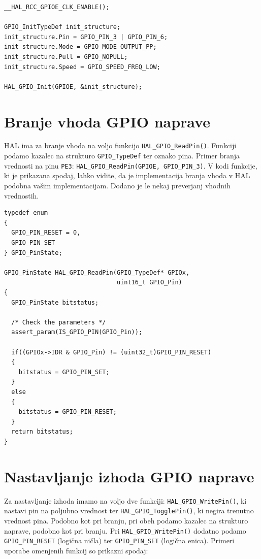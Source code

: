 \documentclass[12pt,letterpaper]{article}
\begin{document}
\begin{center}
\begin{lstlisting}[style=CStyle]
__HAL_RCC_GPIOE_CLK_ENABLE();

GPIO_InitTypeDef init_structure;
init_structure.Pin = GPIO_PIN_3 | GPIO_PIN_6;
init_structure.Mode = GPIO_MODE_OUTPUT_PP;
init_structure.Pull = GPIO_NOPULL;
init_structure.Speed = GPIO_SPEED_FREQ_LOW;

HAL_GPIO_Init(GPIOE, &init_structure);
\end{lstlisting}
\end{center}


\section*{Branje vhoda GPIO naprave}

HAL ima za branje vhoda na voljo funkcijo \texttt{HAL\_GPIO\_ReadPin()}. Funkciji podamo kazalec na strukturo \texttt{GPIO\_TypeDef} ter oznako pina. Primer branja vrednosti na pinu \texttt{PE3}: \texttt{HAL\_GPIO\_ReadPin(GPIOE, GPIO\_PIN\_3)}. V kodi funkcije, ki je prikazana spodaj, lahko vidite, da je implementacija branja vhoda v HAL podobna vašim implementacijam. Dodano je le nekaj preverjanj vhodnih vrednostih.

\begin{center}
\begin{lstlisting}[style=CStyle]
typedef enum
{
  GPIO_PIN_RESET = 0,
  GPIO_PIN_SET
} GPIO_PinState;

GPIO_PinState HAL_GPIO_ReadPin(GPIO_TypeDef* GPIOx,
                               uint16_t GPIO_Pin)
{
  GPIO_PinState bitstatus;

  /* Check the parameters */
  assert_param(IS_GPIO_PIN(GPIO_Pin));

  if((GPIOx->IDR & GPIO_Pin) != (uint32_t)GPIO_PIN_RESET)
  {
    bitstatus = GPIO_PIN_SET;
  }
  else
  {
    bitstatus = GPIO_PIN_RESET;
  }
  return bitstatus;
}
\end{lstlisting}
\end{center}


\section*{Nastavljanje izhoda GPIO naprave}

Za nastavljanje izhoda imamo na voljo dve funkciji: \texttt{HAL\_GPIO\_WritePin()}, ki nastavi pin na poljubno vrednost ter \texttt{HAL\_GPIO\_TogglePin()}, ki negira trenutno vrednost pina. Podobno kot pri branju, pri obeh podamo kazalec na strukturo naprave, podobno kot pri branju. Pri \texttt{HAL\_GPIO\_WritePin()} dodatno podamo \texttt{GPIO\_PIN\_RESET} (logična ničla) ter \texttt{GPIO\_PIN\_SET} (logična enica). Primeri uporabe omenjenih funkcij so prikazni spodaj:
\end{document}
